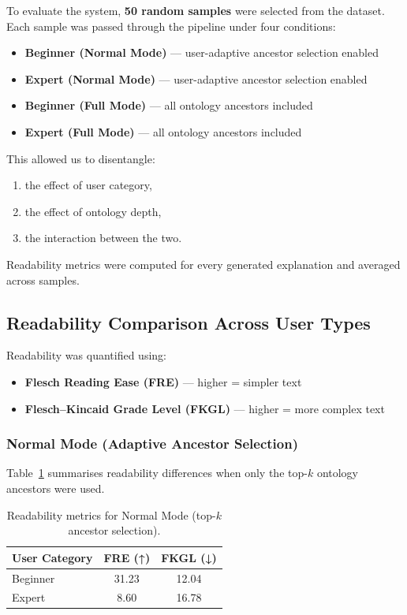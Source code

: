To evaluate the system, \textbf{50 random samples} were selected from the dataset.  
Each sample was passed through the pipeline under four conditions:

\begin{itemize}
    \item \textbf{Beginner (Normal Mode)} — user-adaptive ancestor selection enabled  
    \item \textbf{Expert (Normal Mode)} — user-adaptive ancestor selection enabled  
    \item \textbf{Beginner (Full Mode)} — all ontology ancestors included  
    \item \textbf{Expert (Full Mode)} — all ontology ancestors included  
\end{itemize}

This allowed us to disentangle:

\begin{enumerate}
    \item the effect of user category,
    \item the effect of ontology depth,
    \item the interaction between the two.
\end{enumerate}

Readability metrics were computed for every generated explanation and averaged across samples.

\subsection{Readability Comparison Across User Types}
\label{subsec:readability_comparison}

Readability was quantified using:

\begin{itemize}
    \item \textbf{Flesch Reading Ease (FRE)} — higher = simpler text
    \item \textbf{Flesch--Kincaid Grade Level (FKGL)} — higher = more complex text
\end{itemize}

\subsubsection*{Normal Mode (Adaptive Ancestor Selection)}
Table~\ref{tab:normal_mode_readability} summarises readability differences when only the top-$k$ ontology ancestors were used.

\begin{table}[h]
\centering
\small
\begin{tabular}{lcc}
\toprule
\textbf{User Category} & \textbf{FRE (↑)} & \textbf{FKGL (↓)} \\
\midrule
Beginner & 31.23 & 12.04 \\
Expert   & 8.60  & 16.78 \\
\bottomrule
\end{tabular}
\caption{Readability metrics for Normal Mode (top-$k$ ancestor selection).}
\label{tab:normal_mode_readability}
\end{table}

